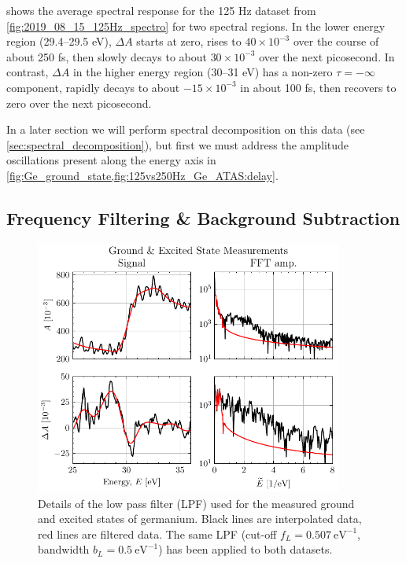  shows the average spectral response for the 125 Hz dataset from \cref{fig:2019_08_15_125Hz_spectro} for two spectral regions. In the lower energy region (29.4--29.5 eV), $\Delta A$ starts at zero, rises to $40 \times 10^{-3}$ over the course of about 250 fs, then slowly decays to about $30 \times 10^{-3}$ over the next picosecond. In contrast, $\Delta A$ in the higher energy region (30--31 eV) has a non-zero $\tau=-\infty$ component, rapidly decays to about $-15 \times 10^{-3}$ in about 100 fs, then recovers to zero over the next picosecond.

In a later section we will perform spectral decomposition on this data (see \cref{sec:spectral_decomposition}), but first we must address the amplitude oscillations present along the energy axis in \cref{fig:Ge_ground_state,fig:125vs250Hz_Ge_ATAS:delay}.

\subsection{Frequency Filtering \& Background Subtraction}
\label{sec:freq_filt}

\begin{figure}
	\centering
	\includegraphics[width=0.9\textwidth]{figures/chap4/unfiltered_A_dA.pdf}
	\caption{Details of the low pass filter (LPF) used for the measured ground and excited states of germanium. Black lines are interpolated data, red lines are filtered data. The same LPF (cut-off $f_L = 0.507 \ \textrm{eV}^{-1}$, bandwidth $b_L = 0.5 \ \textrm{eV}^{-1}$) has been applied to both datasets.}
	\label{fig:unfiltered_A_dA}
\end{figure}

